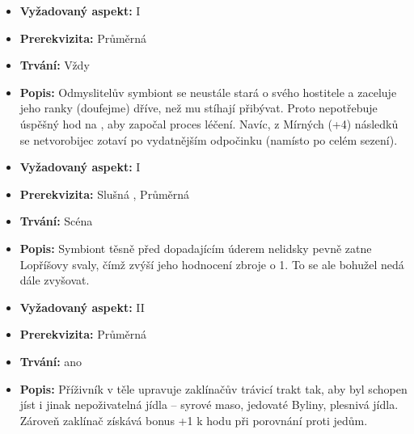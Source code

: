 \documentclass[../main.tex]{subfiles}
\begin{document}
\begin{specialita}
\begin{itemize}
	\item \textbf{Vyžadovaný aspekt:} I
	\item \textbf{Prerekvizita:} Průměrná 
	\item \textbf{Trvání:} Vždy
	\item \textbf{Popis:} Odmyslitelův symbiont se neustále stará o svého hostitele a zaceluje jeho ranky (doufejme) dříve, než mu stíhají přibývat. Proto nepotřebuje úspěšný hod na , aby započal proces léčení. Navíc, z Mírných (+4) následků se netvorobijec zotaví po vydatnějším odpočinku (namísto po celém sezení).
\end{itemize}
\end{specialita}

\begin{specialita}
\begin{itemize}
	\item \textbf{Vyžadovaný aspekt:} I
	\item \textbf{Prerekvizita:} Slušná , Průměrná 
	\item \textbf{Trvání:} Scéna
	\item \textbf{Popis:} Symbiont těsně před dopadajícím úderem nelidsky pevně zatne Lopříšovy svaly, čímž zvýší jeho hodnocení zbroje o 1. To se ale bohužel nedá dále zvyšovat.
\end{itemize}
\end{specialita}

\begin{specialita}
\begin{itemize}
	\item \textbf{Vyžadovaný aspekt:} II
	\item \textbf{Prerekvizita:} Průměrná 
	\item \textbf{Trvání:} ano
	\item \textbf{Popis:} Příživník v těle upravuje zaklínačův trávicí trakt tak, aby byl schopen jíst i jinak nepoživatelná jídla – syrové maso, jedovaté Byliny, plesnivá jídla. Zároveň zaklínač získává bonus +1 k hodu při porovnání  proti jedům.
\end{itemize}
\end{specialita}
\end{document}
